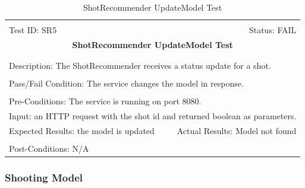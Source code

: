 \documentclass[11pt]{article}
\begin{document}
\begin{center}
\begin{table}[H]
\begin{tabular}{|l r|}\hline&\\[-2mm]
	Test ID: SR5	&Status: FAIL\\[-3mm]
	\multicolumn{2}{|c|}{\textbf{\large{ShotRecommender UpdateModel Test}}}\\&\\\hline&\\[-3mm]
	\multicolumn{2}{|p{\textwidth}|}{Description: The ShotRecommender receives a status update for a shot.}\\[1mm]\hline&\\[-3mm]
	\multicolumn{2}{|p{\textwidth}|}{Pass/Fail Condition: The service changes the model in response.}\\[1mm]\hline&\\[-3mm]
	\multicolumn{2}{|p{\textwidth}|}{Pre-Conditions: The service is running on port 8080.}\\[4mm]
	\multicolumn{2}{|p{\textwidth}|}{Input: an HTTP request with the shot id and returned boolean as parameters.}\\[2mm]\hline
	\multicolumn{1}{|p{0.49\textwidth}}{Expected Results: the model is updated}	&\multicolumn{1}{|p{0.45\textwidth}|}{Actual Results: Model not found}\\\hline&\\[-3mm]
	\multicolumn{2}{|p{\textwidth}|}{Post-Conditions: N/A}\\\hline
\end{tabular}
\caption{ShotRecommender UpdateModel Test}
\end{table}
\end{center}

\subsubsection{Shooting Model}
\end{document}
